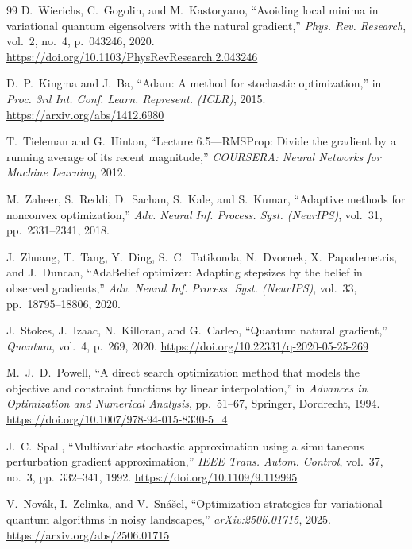 \documentclass[sn-mathphys,Numbered]{sn-jnl}
\theoremstyle{thmstyleone}
\theoremstyle{thmstyletwo}
\theoremstyle{thmstylethree}
\begin{document}
\begin{thebibliography}{99}
D.~Wierichs, C.~Gogolin, and M.~Kastoryano,
\newblock ``Avoiding local minima in variational quantum eigensolvers with the natural gradient,''
\newblock \emph{Phys. Rev. Research}, vol.~2, no.~4, p.~043246, 2020. \url{https://doi.org/10.1103/PhysRevResearch.2.043246}

D.~P.~Kingma and J.~Ba,
\newblock ``Adam: A method for stochastic optimization,''
\newblock in \emph{Proc. 3rd Int. Conf. Learn. Represent. (ICLR)}, 2015. \url{https://arxiv.org/abs/1412.6980}

T.~Tieleman and G.~Hinton,
\newblock ``Lecture 6.5---RMSProp: Divide the gradient by a running average of its recent magnitude,''
\newblock \emph{COURSERA: Neural Networks for Machine Learning}, 2012.

M.~Zaheer, S.~Reddi, D.~Sachan, S.~Kale, and S.~Kumar,
\newblock ``Adaptive methods for nonconvex optimization,''
\newblock \emph{Adv. Neural Inf. Process. Syst. (NeurIPS)}, vol.~31, pp.~2331--2341, 2018.

J.~Zhuang, T.~Tang, Y.~Ding, S.~C.~Tatikonda, N.~Dvornek, X.~Papademetris, and J.~Duncan,
\newblock ``AdaBelief optimizer: Adapting stepsizes by the belief in observed gradients,''
\newblock \emph{Adv. Neural Inf. Process. Syst. (NeurIPS)}, vol.~33, pp.~18795--18806, 2020.

J.~Stokes, J.~Izaac, N.~Killoran, and G.~Carleo,
\newblock ``Quantum natural gradient,''
\newblock \emph{Quantum}, vol.~4, p.~269, 2020. \url{https://doi.org/10.22331/q-2020-05-25-269}

M.~J.~D.~Powell,
\newblock ``A direct search optimization method that models the objective and constraint functions by linear interpolation,''
\newblock in \emph{Advances in Optimization and Numerical Analysis}, pp.~51--67, Springer, Dordrecht, 1994. \url{https://doi.org/10.1007/978-94-015-8330-5_4}

J.~C.~Spall,
\newblock ``Multivariate stochastic approximation using a simultaneous perturbation gradient approximation,''
\newblock \emph{IEEE Trans. Autom. Control}, vol.~37, no.~3, pp.~332--341, 1992. \url{https://doi.org/10.1109/9.119995}

V.~Nov{\'a}k, I.~Zelinka, and V.~Sn{\'a}{\v{s}}el,
\newblock ``Optimization strategies for variational quantum algorithms in noisy landscapes,''
\newblock \emph{arXiv:2506.01715}, 2025. \url{https://arxiv.org/abs/2506.01715}


\end{thebibliography}
\end{document}

